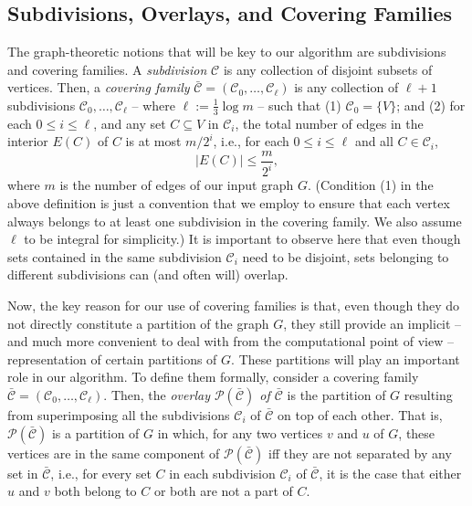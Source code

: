 \documentclass[11pt, letterpaper]{article}
\newcommand{\cC}{\mathcal{C}}
\newcommand{\ocC}{\bar{\mathcal{C}}}
\newcommand{\cP}{\mathcal{P}}
\begin{document}
\subsection{Subdivisions, Overlays, and Covering Families}\label{sec:covering_families}

The graph-theoretic notions that will be key to our algorithm are subdivisions and covering families. A {\em subdivision} $\cC$ is any collection of { disjoint} subsets of vertices. Then, a {\em covering family} $\ocC=(\cC_0,\ldots, \cC_{\ell})$ is any collection of $\ell+1$ subdivisions $\cC_0,\ldots, \cC_{\ell}$ -- where $\ell := \frac{1}{3} \log m$ --  such that (1) $\cC_0=\{V\}$; and (2) for each $0\leq i\leq \ell$, and any set $C\subseteq V$ in $\cC_i$, the total number of edges in the interior $E(C)$ of $C$ is at most ${m}/{2^i}$, i.e., for each $0\leq i \leq \ell$ and all $C\in \cC_i$,
\begin{equation}
\label{eq:def_size_bound_covering_family}
|E(C)| \leq \frac{m}{2^i},
\end{equation}
where $m$ is the number of edges of our input graph $G$. (Condition (1) in the above definition is just a convention that we employ to ensure that each vertex always belongs to at least one subdivision in the covering family. We also assume $\ell$ to be integral for simplicity.) It is important to observe here that even though sets contained in the same subdivision $\cC_i$ need to be disjoint, sets belonging to different subdivisions can (and often will) overlap.

Now, the key reason for our use of covering families is that, even though they do not directly constitute a partition of the graph $G$, they still provide an implicit -- and much more convenient to deal with from the computational point of view -- representation of certain partitions of $G$. These partitions will play an important role in our algorithm. To define them formally, consider a covering family $\ocC=(\cC_0,\ldots, \cC_{\ell})$. Then, the {\em overlay $\cP(\ocC)$ of $\ocC$} is the partition of $G$ resulting from superimposing all the subdivisions $\cC_i$ of $\ocC$ on top of each other. That is, $\cP(\ocC)$ is a partition of $G$ in which, for any two vertices $v$ and $u$ of $G$, these vertices are in the same component of $\cP(\ocC)$ iff they are not separated by any set in $\ocC$, i.e., for every set $C$ in each subdivision $\cC_i$ of $\ocC$, it is the case that either $u$ and $v$ both belong to $C$ or both are not a part of $C$.
\end{document}
